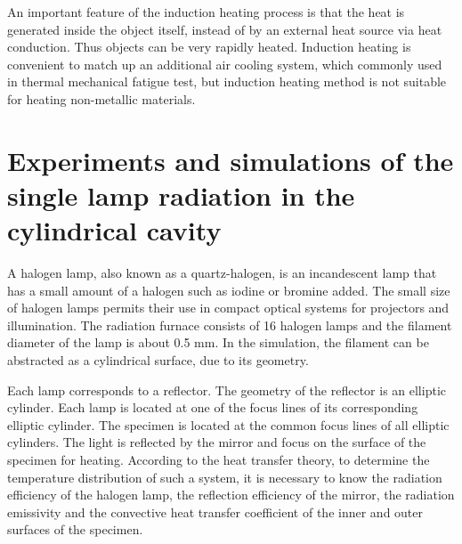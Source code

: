 An important feature of the induction heating process is that the heat is generated inside the object itself, instead of by an external heat source via heat conduction. Thus objects can be very rapidly heated.
Induction heating is convenient to match up an additional air cooling system, which commonly used in thermal mechanical fatigue test, but induction heating method is not suitable for heating non-metallic materials.




\section{Experiments and simulations of the single lamp radiation in the cylindrical cavity}
\noindent
A halogen lamp, also known as a quartz-halogen, is an incandescent lamp that has a small amount of a halogen such as iodine or bromine added.
The small size of halogen lamps permits their use in compact optical systems for projectors and illumination.
The radiation furnace consists of 16 halogen lamps and the filament diameter of the lamp is about 0.5 mm. In the simulation, the filament can be abstracted as a cylindrical surface, due to its geometry.

Each lamp corresponds to a reflector. The geometry of the reflector is an elliptic cylinder. Each lamp is located at one of the focus
lines of its corresponding elliptic cylinder. The specimen is located at the common focus lines of all elliptic cylinders. The light is reflected by the mirror and focus on the surface of the specimen for heating.
According to the heat transfer theory, to determine the temperature distribution of such a system, it is necessary to know the radiation efficiency of the halogen lamp, the reflection efficiency of the mirror, the radiation emissivity and the convective heat transfer coefficient of the inner and outer surfaces of the specimen.

